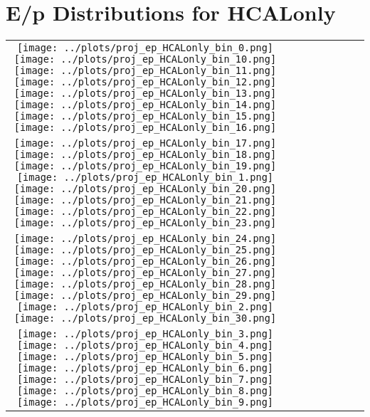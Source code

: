 \documentclass[a4paper,10pt]{article}
\begin{document}
\section*{E/p Distributions for HCALonly}
\begin{center}
\setlength{\tabcolsep}{2pt}
\renewcommand{\arraystretch}{1.0}
\begin{tabular}{cccccccc}
    \texttt{[image: ../plots/proj\_ep\_HCALonly\_bin\_0.png]} %
    \texttt{[image: ../plots/proj\_ep\_HCALonly\_bin\_10.png]} %
    \texttt{[image: ../plots/proj\_ep\_HCALonly\_bin\_11.png]} %
    \texttt{[image: ../plots/proj\_ep\_HCALonly\_bin\_12.png]} %
    \texttt{[image: ../plots/proj\_ep\_HCALonly\_bin\_13.png]} %
    \texttt{[image: ../plots/proj\_ep\_HCALonly\_bin\_14.png]} %
    \texttt{[image: ../plots/proj\_ep\_HCALonly\_bin\_15.png]} %
    \texttt{[image: ../plots/proj\_ep\_HCALonly\_bin\_16.png]} \\
    \texttt{[image: ../plots/proj\_ep\_HCALonly\_bin\_17.png]} %
    \texttt{[image: ../plots/proj\_ep\_HCALonly\_bin\_18.png]} %
    \texttt{[image: ../plots/proj\_ep\_HCALonly\_bin\_19.png]} %
    \texttt{[image: ../plots/proj\_ep\_HCALonly\_bin\_1.png]} %
    \texttt{[image: ../plots/proj\_ep\_HCALonly\_bin\_20.png]} %
    \texttt{[image: ../plots/proj\_ep\_HCALonly\_bin\_21.png]} %
    \texttt{[image: ../plots/proj\_ep\_HCALonly\_bin\_22.png]} %
    \texttt{[image: ../plots/proj\_ep\_HCALonly\_bin\_23.png]} \\
    \texttt{[image: ../plots/proj\_ep\_HCALonly\_bin\_24.png]} %
    \texttt{[image: ../plots/proj\_ep\_HCALonly\_bin\_25.png]} %
    \texttt{[image: ../plots/proj\_ep\_HCALonly\_bin\_26.png]} %
    \texttt{[image: ../plots/proj\_ep\_HCALonly\_bin\_27.png]} %
    \texttt{[image: ../plots/proj\_ep\_HCALonly\_bin\_28.png]} %
    \texttt{[image: ../plots/proj\_ep\_HCALonly\_bin\_29.png]} %
    \texttt{[image: ../plots/proj\_ep\_HCALonly\_bin\_2.png]} %
    \texttt{[image: ../plots/proj\_ep\_HCALonly\_bin\_30.png]} \\
    \texttt{[image: ../plots/proj\_ep\_HCALonly\_bin\_3.png]} %
    \texttt{[image: ../plots/proj\_ep\_HCALonly\_bin\_4.png]} %
    \texttt{[image: ../plots/proj\_ep\_HCALonly\_bin\_5.png]} %
    \texttt{[image: ../plots/proj\_ep\_HCALonly\_bin\_6.png]} %
    \texttt{[image: ../plots/proj\_ep\_HCALonly\_bin\_7.png]} %
    \texttt{[image: ../plots/proj\_ep\_HCALonly\_bin\_8.png]} %
    \texttt{[image: ../plots/proj\_ep\_HCALonly\_bin\_9.png]} %
\end{tabular}
\end{center}
\end{document}

